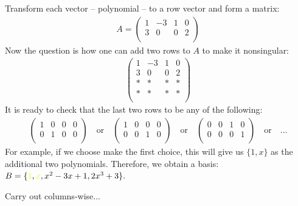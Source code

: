 \documentclass[pdf,9pt]{beamer}
\begin{document}
\begin{frame}[fragile]
    \begin{solution}[method 2.]
	Transform each vector -- polynomial -- to a row vector and form a matrix:
	\begin{align*}
	    A = \begin{pmatrix}
		    1 & -3 & 1 & 0 \\
		    3 & 0  & 0 & 2 \\
		\end{pmatrix}
	\end{align*}
	Now the question is how one can add two rows to $A$ to make it nonsingular:
	\begin{align*}
	    \begin{pmatrix}
		1 & -3 & 1 & 0 \\
		3 & 0  & 0 & 2 \\
		* & *  & * & * \\
		* & *  & * & * \\
	    \end{pmatrix}
	\end{align*}
	It is ready to check that the last two rows to be any of the following:
	\begin{align*}
	    \begin{pmatrix}
		1 & 0 & 0 & 0 \\
		0 & 1 & 0 & 0 \\
	    \end{pmatrix}\quad\text{or}\quad
	\begin{pmatrix}
		1 & 0 & 0 & 0 \\
		0 & 0 & 1 & 0 \\
	    \end{pmatrix}\quad\text{or}\quad
	\begin{pmatrix}
		0 & 0 & 1 & 0 \\
		0 & 0 & 0 & 1 \\
	    \end{pmatrix}\quad\text{or}\quad ...
	\end{align*}
	For example, if we choose make the first choice, this will give us $\{1,x\}$ as the
	additional two polynomials. Therefore, we obtain a basis:
	$B= \{\textcolor{yellow}{1},\textcolor{yellow}{x}, x^2-3x+1, 2x^3+3\}.$
	\myQED
    \end{solution}
    \pause
    \vfill
    \begin{solution}[method 3.]
       Carry out columns-wise... \myQED
    \end{solution}
\end{frame}
\end{document}
